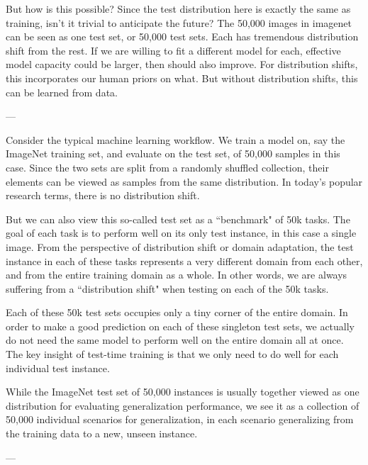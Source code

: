 But how is this possible? Since the test distribution here is exactly the same as training, isn't it trivial to anticipate the future?
The 50,000 images in imagenet can be seen as one test set, or 50,000 test sets. Each has tremendous distribution shift from the rest. If we are willing to fit a different model for each, effective model capacity could be larger, then should also improve. 
For distribution shifts, this incorporates our human priors on what. But without distribution shifts, this can be learned from data. 

---

Consider the typical machine learning workflow. 
We train a model on, say the ImageNet training set, and evaluate on the test set, of 50,000 samples in this case.
Since the two sets are split from a randomly shuffled collection, their elements can be viewed as samples from the same distribution.
In today's popular research terms, there is no distribution shift.

But we can also view this so-called test set as a ``benchmark" of 50k tasks. The goal of each task is to perform well on its only test instance, in this case a single image.
From the perspective of distribution shift or domain adaptation, the test instance in each of these tasks represents a very different domain from each other, and from the entire training domain as a whole.
In other words, we are always suffering from a ``distribution shift" when testing on each of the 50k tasks. 

Each of these 50k test sets occupies only a tiny corner of the entire domain.
In order to make a good prediction on each of these singleton test sets, 
we actually do not need the same model to perform well on the entire domain all at once. 
The key insight of test-time training is that we only need to do well for each individual test instance.

While the ImageNet test set of 50,000 instances is usually together viewed as one distribution for evaluating generalization performance, we see it as a collection of 50,000 individual scenarios for generalization, in each scenario generalizing from the training data to a new, unseen instance.

---



